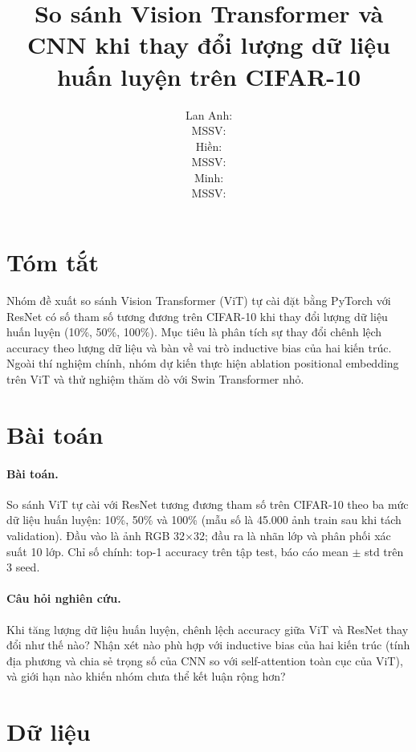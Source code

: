 \documentclass[11pt,a4paper]{article}
\title{So sánh Vision Transformer và CNN khi thay đổi lượng dữ liệu huấn luyện trên CIFAR-10}
\author{%
  Lan Anh: \underline{\hspace{1.4cm}} \\
  MSSV: \underline{\hspace{2cm}} \\
  \And
  Hiền: \underline{\hspace{1.4cm}} \\
  MSSV: \underline{\hspace{2cm}} \\
  \And
  Minh: \underline{\hspace{1.4cm}} \\
  MSSV: \underline{\hspace{2cm}} \\
}
\begin{document}
\maketitle

\section*{Tóm tắt}

Nhóm đề xuất so sánh Vision Transformer (ViT) tự cài đặt bằng PyTorch với ResNet có số tham số tương đương trên CIFAR-10 khi thay đổi lượng dữ liệu huấn luyện (10\%, 50\%, 100\%). Mục tiêu là phân tích sự thay đổi chênh lệch accuracy theo lượng dữ liệu và bàn về vai trò inductive bias của hai kiến trúc. Ngoài thí nghiệm chính, nhóm dự kiến thực hiện ablation positional embedding trên ViT và thử nghiệm thăm dò với Swin Transformer nhỏ.

\section{Bài toán}

\paragraph{Bài toán.}
So sánh ViT tự cài với ResNet tương đương tham số trên CIFAR-10 theo ba mức dữ liệu huấn luyện: 10\%, 50\% và 100\% (mẫu số là 45.000 ảnh train sau khi tách validation). Đầu vào là ảnh RGB 32$\times$32; đầu ra là nhãn lớp và phân phối xác suất 10 lớp. Chỉ số chính: top-1 accuracy trên tập test, báo cáo mean $\pm$ std trên 3 seed.

\paragraph{Câu hỏi nghiên cứu.}
Khi tăng lượng dữ liệu huấn luyện, chênh lệch accuracy giữa ViT và ResNet thay đổi như thế nào? Nhận xét nào phù hợp với inductive bias của hai kiến trúc (tính địa phương và chia sẻ trọng số của CNN so với self-attention toàn cục của ViT), và giới hạn nào khiến nhóm chưa thể kết luận rộng hơn?

\section{Dữ liệu}
\end{document}
